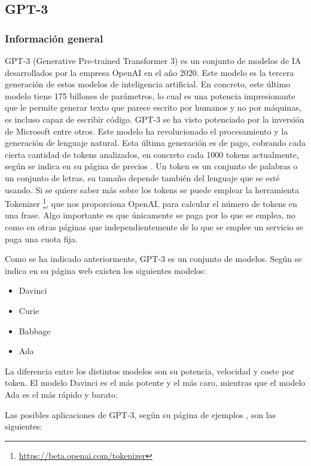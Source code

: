 \subsection{GPT-3}

\subsubsection*{Información general}

GPT-3 (Generative Pre-trained Transformer 3) es un conjunto de modelos de \gls{IA} desarrollados por la empresa OpenAI en el año 2020. Este modelo es la tercera generación de estos modelos de inteligencia artificial. En concreto, este último modelo tiene 175 billones de parámetros, lo cual es una potencia impresionante que le permite generar texto que parece escrito por humanos y no por máquinas, es incluso capaz de escribir código. GPT-3 se ha visto potenciado por la inversión de Microsoft entre otros. Este modelo ha revolucionado el procesamiento y la generación de lenguaje natural. Esta última generación es de pago, cobrando cada cierta cantidad de tokens analizados, en concreto cada 1000 tokens actualmente, según se indica en su página de precios \cite{RefWorks:RefID:21-openai.}. Un token es un conjunto de palabras o un conjunto de letras, su tamaño depende también del lenguaje que se esté usando. Si se quiere saber más sobre los tokens se puede emplear la herramienta Tokenizer \footnote{\url{https://beta.openai.com/tokenizer}}, que nos proporciona OpenAI, para calcular el número de tokens en una frase. Algo importante es que únicamente se paga por lo que se emplea, no como en otras páginas que independientemente de lo que se emplee un servicio se paga una cuota fija.

Como se ha indicado anteriormente, GPT-3 es un conjunto de modelos. Según se indica en su página web \cite{RefWorks:RefID:22-modelos} existen los siguientes modelos:

\begin{itemize}
\item Davinci
\item Curie
\item Babbage
\item Ada
\end{itemize}

La diferencia entre los distintos modelos son su potencia, velocidad y coste por token. El modelo Davinci es el más potente y el más caro, mientras que el modelo Ada es el más rápido y barato.

Las posibles aplicaciones de GPT-3, según su página de ejemplos \cite{RefWorks:RefID:23-openai.}, son las siguientes:

